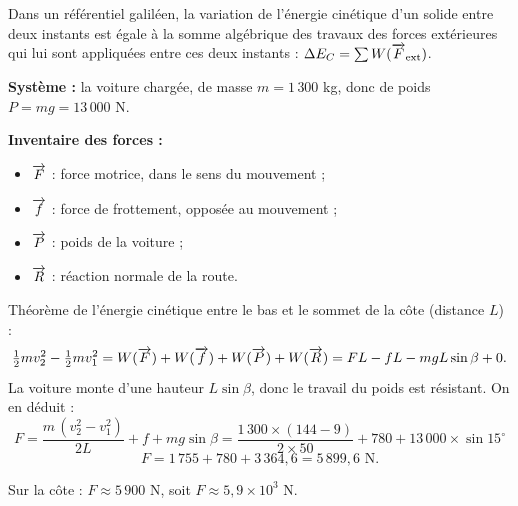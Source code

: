 
Dans un référentiel galiléen, la variation de l'énergie cinétique d'un solide entre deux instants est
égale à la somme algébrique des travaux des forces extérieures qui lui sont appliquées entre ces
deux instants : $\Delta E_C = \sum W(\overrightarrow{F}_{\text{ext}})$.

\begin{minipage}[t]{0.55\textwidth}
\vspace{0pt}
\textbf{Système :} la voiture chargée, de masse $m = 1\,300$ kg, donc de poids
$P = m g = 13\,000$ N.

\textbf{Inventaire des forces :}
\begin{itemize}
  \item $\overrightarrow{F}$ : force motrice, dans le sens du mouvement ;
  \item $\overrightarrow{f}$ : force de frottement, opposée au mouvement ;
  \item $\overrightarrow{P}$ : poids de la voiture ;
  \item $\overrightarrow{R}$ : réaction normale de la route.
\end{itemize}
\end{minipage}\hfill
\begin{minipage}[t]{0.42\textwidth}
\vspace{0pt}
\centering
{}
\end{minipage}

Théorème de l'énergie cinétique entre le bas et le sommet de la côte (distance $L$) :
\[
\tfrac{1}{2} m v_2^2 - \tfrac{1}{2} m v_1^2
= W(\overrightarrow{F}) + W(\overrightarrow{f}) + W(\overrightarrow{P}) + W(\overrightarrow{R})
= F L - f L - m g L \sin\beta + 0.
\]
La voiture monte d'une hauteur $L\sin\beta$, donc le travail du poids est résistant. On en déduit :
\[
F = \frac{m\,(v_2^2 - v_1^2)}{2L} + f + m g \sin\beta
= \frac{1\,300 \times (144 - 9)}{2 \times 50} + 780 + 13\,000 \times \sin 15^\circ
\]
\[
F = 1\,755 + 780 + 3\,364,6 = 5\,899,6 \text{ N.}
\]
\begin{resultat}
Sur la côte : $F \approx 5\,900$ N, soit $F \approx 5,9 \times 10^3$ N.
\end{resultat}

